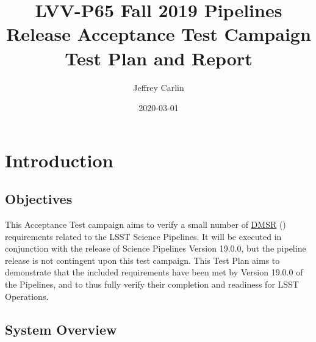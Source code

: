 \documentclass[DM,STR,toc]{lsstdoc}
\begin{document}
\def\milestoneName{Fall 2019 Pipelines Release Acceptance Test Campaign}
\def\milestoneId{LVV-P65}
\def\product{Acceptance}


\title{ LVV-P65 Fall 2019 Pipelines Release Acceptance Test Campaign Test Plan and Report}
\setDocRef{\lsstDocType-\lsstDocNum}
\date{2020-03-01}
\author{ Jeffrey Carlin }






\maketitle

\section{Introduction}
\label{sect:intro}


\subsection{Objectives}
\label{sect:objectives}

 This Acceptance Test campaign aims to verify a small number of
\href{https://lse-61.lsst.io/}{DMSR} () requirements related to
the LSST Science Pipelines. It will be executed in conjunction with the
release of Science Pipelines Version 19.0.0, but the pipeline release is
not contingent upon this test campaign. This Test Plan aims to
demonstrate that the included requirements have been met by Version
19.0.0 of the Pipelines, and to thus fully verify their completion and
readiness for LSST Operations.



\subsection{System Overview}
\label{sect:systemoverview}
\end{document}
